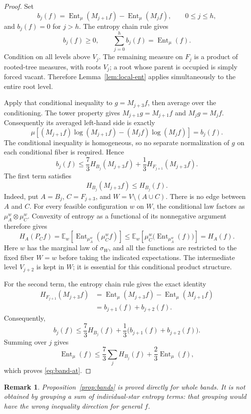 \documentclass[11pt]{article}
\newtheorem{remark}[theorem]{Remark}
\newcommand{\E}{\mathbb E}
\newcommand{\Ent}{\operatorname{Ent}}
\begin{document}
\begin{proof}
Set
\[
b_j(f)=\Ent_\mu(M_{j+1}f)-\Ent_\mu(M_jf),\qquad 0\le j\le h,
\]
and $b_j(f)=0$ for $j>h$. The entropy chain rule gives
\[
b_j(f)\ge0,\qquad \sum_{j=0}^h b_j(f)=\Ent_\mu(f).
\]
Condition on all levels above $V_j$. The remaining measure on $F_j$ is a product of rooted-tree measures, with roots $V_j$; a root whose parent is occupied is simply forced vacant. Therefore Lemma~\ref{lem:local-ent} applies simultaneously to the entire root level.

Apply that conditional inequality to $g=M_{j+3}f$, then average over the conditioning. The tower property gives $M_{j+1}g=M_{j+1}f$ and $M_jg=M_jf$. Consequently its averaged left-hand side is exactly
\[
\mu\!\left[(M_{j+1}f)\log(M_{j+1}f)-(M_jf)\log(M_jf)\right]=b_j(f).
\]
The conditional inequality is homogeneous, so no separate normalization of $g$ on each conditional fiber is required. Hence
\[
b_j(f)\le\frac73 H_{B_j}(M_{j+3}f)
+\frac13 H_{F_{j+1}}(M_{j+3}f).
\]
The first term satisfies
\[
H_{B_j}(M_{j+3}f)\le H_{B_j}(f).
\]
Indeed, put $A=B_j$, $C=F_{j+3}$, and $W=V\setminus(A\cup C)$. There is no edge between $A$ and $C$. For every feasible configuration $w$ on $W$, the conditional law factors as $\mu_A^w\otimes\mu_C^w$. Convexity of entropy as a functional of its nonnegative argument therefore gives
\[
H_A(P_Cf)
=\E_w\!\left[\Ent_{\mu_A^w}(\mu_C^w f)\right]
\le \E_w\!\left[\mu_C^w\bigl(\Ent_{\mu_A^w}(f)\bigr)\right]
=H_A(f).
\]
Here $w$ has the marginal law of $\sigma_W$, and all the functions are restricted to the fixed fiber $W=w$ before taking the indicated expectations. The intermediate level $V_{j+2}$ is kept in $W$; it is essential for this conditional product structure.

For the second term, the entropy chain rule gives the exact identity
\begin{align*}
H_{F_{j+1}}(M_{j+3}f)
&=\Ent_\mu(M_{j+3}f)-\Ent_\mu(M_{j+1}f)\\
&=b_{j+1}(f)+b_{j+2}(f).
\end{align*}
Consequently,
\[
b_j(f)\le\frac73 H_{B_j}(f)
+\frac13\bigl(b_{j+1}(f)+b_{j+2}(f)\bigr).
\]
Summing over $j$ gives
\[
\Ent_\mu(f)\le\frac73\sum_jH_{B_j}(f)+\frac23\Ent_\mu(f),
\]
which proves \eqref{eq:band-at}.
\end{proof}

\begin{remark}
Proposition~\ref{prop:bands} is proved directly for whole bands. It is not obtained by grouping a sum of individual-star entropy terms: that grouping would have the wrong inequality direction for general $f$.
\end{remark}
\end{document}
